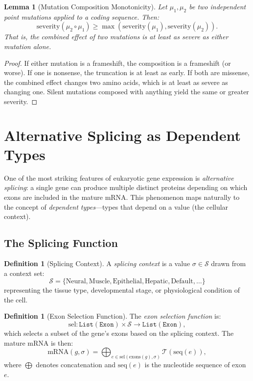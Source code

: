 \documentclass[12pt,a4paper]{article}
\newtheorem{lemma}[theorem]{Lemma}
\theoremstyle{definition}
\newtheorem{definition}[theorem]{Definition}
\begin{document}
\begin{lemma}[Mutation Composition Monotonicity]\label{lem:monotonicity}
Let $\mu_1, \mu_2$ be two independent point mutations applied to a coding sequence. Then:
\[
  \mathrm{severity}(\mu_2 \circ \mu_1) \geq \max(\mathrm{severity}(\mu_1), \mathrm{severity}(\mu_2)).
\]
That is, the combined effect of two mutations is at least as severe as either mutation alone.
\end{lemma}

\begin{proof}
If either mutation is a frameshift, the composition is a frameshift (or worse). If one is nonsense, the truncation is at least as early. If both are missense, the combined effect changes two amino acids, which is at least as severe as changing one. Silent mutations composed with anything yield the same or greater severity.
\end{proof}


\section{Alternative Splicing as Dependent Types}\label{sec:splicing}

One of the most striking features of eukaryotic gene expression is \emph{alternative splicing}: a single gene can produce multiple distinct proteins depending on which exons are included in the mature mRNA. This phenomenon maps naturally to the concept of \emph{dependent types}---types that depend on a value (the cellular context).

\subsection{The Splicing Function}

\begin{definition}[Splicing Context]\label{def:splicing-context}
A \emph{splicing context} is a value $\sigma \in \mathcal{S}$ drawn from a context set:
\[
  \mathcal{S} = \{\text{Neural}, \text{Muscle}, \text{Epithelial}, \text{Hepatic}, \text{Default}, \ldots\}
\]
representing the tissue type, developmental stage, or physiological condition of the cell.
\end{definition}

\begin{definition}[Exon Selection Function]\label{def:exon-selection}
The \emph{exon selection function} is:
\[
  \mathrm{sel} \colon \texttt{List}(\texttt{Exon}) \times \mathcal{S} \to \texttt{List}(\texttt{Exon}),
\]
which selects a subset of the gene's exons based on the splicing context. The mature mRNA is then:
\[
  \mathrm{mRNA}(g, \sigma) = \bigoplus_{e \in \mathrm{sel}(\mathrm{exons}(g), \sigma)} \mathcal{T}(\mathrm{seq}(e)),
\]
where $\bigoplus$ denotes concatenation and $\mathrm{seq}(e)$ is the nucleotide sequence of exon $e$.
\end{definition}
\end{document}

